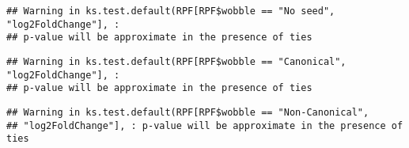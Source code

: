 \documentclass[
]{article}
\newenvironment{Shaded}{\begin{snugshade}}{\end{snugshade}}
\newcommand{\FunctionTok}[1]{\textcolor[rgb]{0.13,0.29,0.53}{\textbf{#1}}}
\newcommand{\NormalTok}[1]{#1}
\newcommand{\OtherTok}[1]{\textcolor[rgb]{0.56,0.35,0.01}{#1}}
\newcommand{\SpecialCharTok}[1]{\textcolor[rgb]{0.81,0.36,0.00}{\textbf{#1}}}
\newcommand{\StringTok}[1]{\textcolor[rgb]{0.31,0.60,0.02}{#1}}
\begin{document}
\begin{verbatim}
## Warning in ks.test.default(RPF[RPF$wobble == "No seed", "log2FoldChange"], :
## p-value will be approximate in the presence of ties
\end{verbatim}

\begin{Shaded}
\end{Shaded}

\begin{verbatim}
## Warning in ks.test.default(RPF[RPF$wobble == "Canonical", "log2FoldChange"], :
## p-value will be approximate in the presence of ties
\end{verbatim}

\begin{Shaded}
\end{Shaded}

\begin{verbatim}
## Warning in ks.test.default(RPF[RPF$wobble == "Non-Canonical",
## "log2FoldChange"], : p-value will be approximate in the presence of ties
\end{verbatim}
\end{document}
